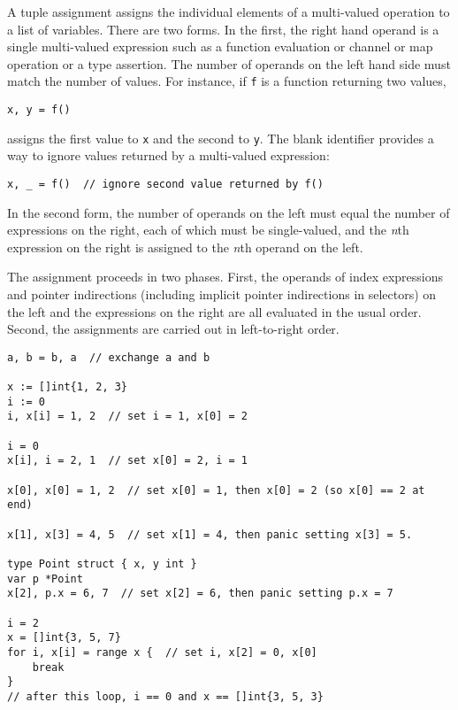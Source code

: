 {A tuple assignment assigns the individual elements of a multi-valued
operation to a list of variables. There are two forms. In the first, the
right hand operand is a single multi-valued expression such as a
function evaluation or channel or
map operation or a
type assertion. The number of operands on
the left hand side must match the number of values. For instance, if
\texttt{f} is a function returning two values,

\begin{Verbatim}[frame=single]
x, y = f()
\end{Verbatim}

assigns the first value to \texttt{x} and the second to \texttt{y}. The
blank identifier provides a way to ignore
values returned by a multi-valued expression:

\begin{Verbatim}[frame=single]
x, _ = f()  // ignore second value returned by f()
\end{Verbatim}

In the second form, the number of operands on the left must equal the
number of expressions on the right, each of which must be single-valued,
and the \emph{n}th expression on the right is assigned to the \emph{n}th
operand on the left.

The assignment proceeds in two phases. First, the operands of
index expressions and
pointer indirections (including implicit
pointer indirections in selectors) on the left and
the expressions on the right are all
evaluated in the usual order. Second,
the assignments are carried out in left-to-right order.

\begin{Verbatim}[frame=single]
a, b = b, a  // exchange a and b

x := []int{1, 2, 3}
i := 0
i, x[i] = 1, 2  // set i = 1, x[0] = 2

i = 0
x[i], i = 2, 1  // set x[0] = 2, i = 1

x[0], x[0] = 1, 2  // set x[0] = 1, then x[0] = 2 (so x[0] == 2 at end)

x[1], x[3] = 4, 5  // set x[1] = 4, then panic setting x[3] = 5.

type Point struct { x, y int }
var p *Point
x[2], p.x = 6, 7  // set x[2] = 6, then panic setting p.x = 7

i = 2
x = []int{3, 5, 7}
for i, x[i] = range x {  // set i, x[2] = 0, x[0]
    break
}
// after this loop, i == 0 and x == []int{3, 5, 3}
\end{Verbatim}

}
